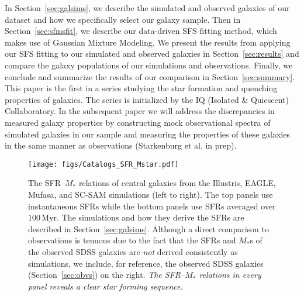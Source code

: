 \documentclass[preprint2,tighten]{aastex62}
\begin{document}
In Section~\ref{sec:galsims}, we describe the simulated and observed 
galaxies of our dataset and how we specifically select our galaxy sample. 
Then in Section~\ref{sec:sfmsfit}, we describe our data-driven SFS 
fitting method, which makes use of Gaussian Mixture Modeling. We present 
the results from applying our SFS fitting to our simulated and observed
galaxies in Section~\ref{sec:results} and compare the galaxy populations
of our simulations and observations. Finally, we conclude and summarize
the results of our comparison in Section~\ref{sec:summary}.
This paper is the first in a series studying the star formation and 
quenching properties of galaxies. The series is initialized by the 
IQ (Isolated \& Quiescent) Collaboratory. %
In the subsequent paper we will address the discrepancies in measured 
galaxy properties by constructing mock observational spectra of simulated 
galaxies in our sample and measuring the properties of these galaxies
in the same manner as observations (Starkenburg et al. in prep).

\begin{figure*}
\begin{center}
\texttt{[image: figs/Catalogs\_SFR\_Mstar.pdf]} 
\caption{The SFR--$M_*$ relations of central galaxies from the Illustris, 
EAGLE, {\sc Mufasa}, and SC-SAM simulations (left to right). The 
top panels use instantaneous SFRs while the bottom panels use SFRs 
averaged over $100\,\mathrm{Myr}$. The simulations and how they derive 
the SFRs are described in Section~\ref{sec:galsims}. Although a
direct comparison to observations is tenuous due to the fact that 
the SFRs and $M_*$s of the observed SDSS galaxies are \emph{not} 
derived consistently as simulations, we include, for reference, the 
observed  SDSS galaxies (Section~\ref{sec:obvs}) on the right. 
\emph{The SFR--$M_*$ relations in every panel reveals a clear star 
forming sequence.}} 
\label{fig:sfrmstar}
\end{center}
\end{figure*}
\end{document}

